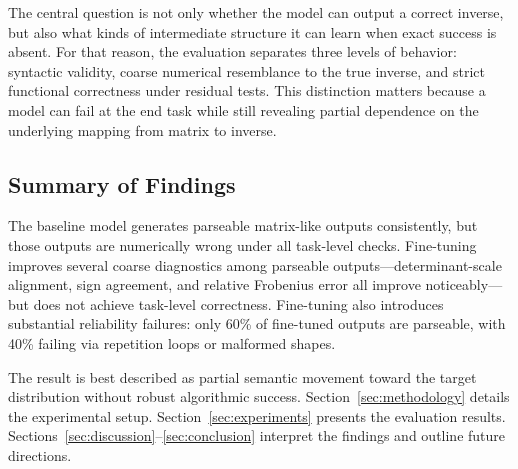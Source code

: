 The central question is not only whether the model can output a correct inverse, but also what kinds of intermediate structure it can learn when exact success is absent. For that reason, the evaluation separates three levels of behavior: syntactic validity, coarse numerical resemblance to the true inverse, and strict functional correctness under residual tests. This distinction matters because a model can fail at the end task while still revealing partial dependence on the underlying mapping from matrix to inverse.

\subsection{Summary of Findings}

The baseline model generates parseable matrix-like outputs consistently, but those outputs are numerically wrong under all task-level checks. Fine-tuning improves several coarse diagnostics among parseable outputs---determinant-scale alignment, sign agreement, and relative Frobenius error all improve noticeably---but does not achieve task-level correctness. Fine-tuning also introduces substantial reliability failures: only 60\% of fine-tuned outputs are parseable, with 40\% failing via repetition loops or malformed shapes.

The result is best described as partial semantic movement toward the target distribution without robust algorithmic success. Section~\ref{sec:methodology} details the experimental setup. Section~\ref{sec:experiments} presents the evaluation results. Sections~\ref{sec:discussion}--\ref{sec:conclusion} interpret the findings and outline future directions.
